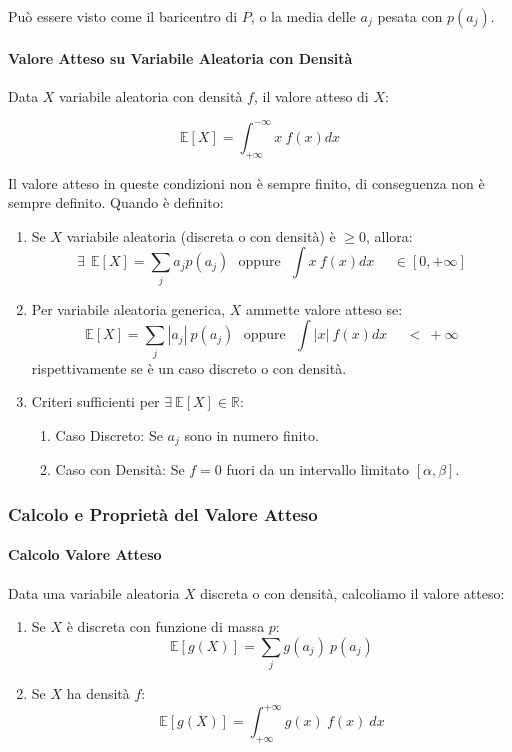 \documentclass{article}
\begin{document}
Può essere visto come il baricentro di $P$, o la media delle $a_{j}$ pesata con $p(a_{j})$.

\paragraph{Valore Atteso su Variabile Aleatoria con Densità} Data $X$ variabile aleatoria con densità $f$, il valore atteso di $X$:

\[ \mathbb{E}[X] = \int_{+\infty}^{-\infty} x\:f(x) dx \]

Il valore atteso in queste condizioni non è sempre finito, di conseguenza non è sempre definito. Quando è definito:

\begin{enumerate}
    \item Se $X$ variabile aleatoria (discreta o con densità) è $\geq 0$, allora:
    \[ \exists \:\: \mathbb{E}[X] = \sum_{j} a_{j}p(a_{j}) \:\:\: \text{oppure} \:\:\: \int x\:f(x)dx \:\:\:\:\:\: \in [0,+\infty] \]
    \item Per variabile aleatoria generica, $X$ ammette valore atteso se:
    \[ \mathbb{E}[X] = \sum_{j} |a_{j}|\:p(a_{j}) \:\:\: \text{oppure} \:\:\: \int |x|\:f(x)dx \:\:\:\:\:\: < \: +\infty \]
    rispettivamente se è un caso discreto o con densità.
    \item Criteri sufficienti per $\exists \: \mathbb{E}[X] \in \mathbb{R}$:
    \begin{enumerate}
        \item Caso Discreto: Se $a_{j}$ sono in numero finito.
        \item Caso con Densità: Se $f=0$ fuori da un intervallo limitato $[\alpha,\beta]$.
    \end{enumerate}
\end{enumerate}

\newpage

\subsubsection{Calcolo e Proprietà del Valore Atteso}

\paragraph{Calcolo Valore Atteso} Data una variabile aleatoria $X$ discreta o con densità, calcoliamo il valore atteso:

\begin{enumerate}
    \item Se $X$ è discreta con funzione di massa $p$:
    \[ \mathbb{E}[g(X)] = \sum_{j} g(a_{j})\:p(a_{j}) \]
    \item Se $X$ ha densità $f$:
    \vspace*{10px}
    \[ \mathbb{E}[g(X)] = \int_{+\infty}^{+\infty} g(x)\:f(x)\:dx \]
\end{enumerate}
\end{document}
